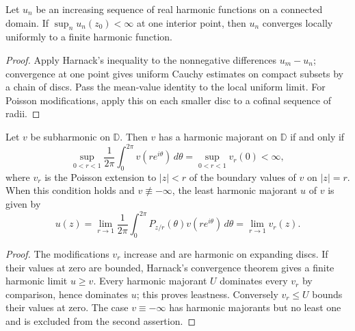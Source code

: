 \begin{theorem}
  \label{thm:harnack_convergence}
  \notready
  Let $u_n$ be an increasing sequence of real harmonic functions on a
  connected domain. If $\sup_n u_n(z_0)<\infty$ at one interior point,
  then $u_n$ converges locally uniformly to a finite harmonic function.
  \begin{proof}
    \notready
    Apply Harnack's inequality to the nonnegative differences $u_m-u_n$;
    convergence at one point gives uniform Cauchy estimates on compact
    subsets by a chain of discs. Pass the mean-value identity to the local
    uniform limit. For Poisson modifications, apply this on each smaller
    disc to a cofinal sequence of radii.
  \end{proof}
\end{theorem}

\begin{theorem}
  \label{thm:I_6_7}
  \leanok
  \mainline
  Let $v$ be subharmonic on $\mathbb{D}$. Then $v$ has a harmonic majorant on
  $\mathbb{D}$ if and only if
  \[
    \sup_{0<r<1}\frac{1}{2\pi}
      \int_0^{2\pi}v(r e^{i\theta})\,d\theta
    = \sup_{0<r<1} v_r(0) < \infty,
  \]
  where $v_r$ is the Poisson extension to $|z|<r$ of the boundary values of
  $v$ on $|z|=r$. When this condition holds and $v\not\equiv-\infty$, the
  least harmonic majorant $u$ of $v$ is given by
  \[
    u(z)=\lim_{r\to 1}
      \frac{1}{2\pi}\int_0^{2\pi}
        P_{z/r}(\theta)v(r e^{i\theta})\,d\theta
      =\lim_{r\to 1}v_r(z).
  \]
  \begin{proof}
    \notready
    The modifications $v_r$ increase and are harmonic on expanding discs.
    If their values at zero are bounded, Harnack's convergence theorem
    gives a finite harmonic limit $u\ge v$. Every harmonic majorant $U$
    dominates every $v_r$ by comparison, hence dominates $u$; this proves
    leastness. Conversely $v_r\le U$ bounds their values at zero.
    The case $v\equiv-\infty$ has harmonic majorants but no least one and
    is excluded from the second assertion.
  \end{proof}
\end{theorem}


